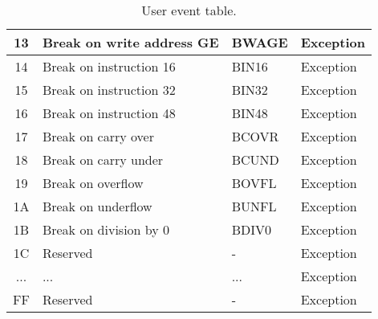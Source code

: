 \begin{table}[hbt!]
\begin{center}
\begin{tabular}{|c|l|l|l|}
        \hline
        13 & Break on write address GE & BWAGE & Exception \\
        \hline
        14 & Break on instruction 16 & BIN16 & Exception \\
        \hline
        15 & Break on instruction 32 & BIN32 & Exception \\
        \hline
        16 & Break on instruction 48 & BIN48 & Exception \\
        \hline
        17 & Break on carry over & BCOVR & Exception \\
        \hline
        18 & Break on carry under & BCUND & Exception \\
        \hline
        19 & Break on overflow & BOVFL & Exception \\
        \hline
        1A & Break on underflow & BUNFL & Exception \\
        \hline
        1B & Break on division by 0 & BDIV0 & Exception \\
        \hline
        1C & Reserved & - & Exception \\
        \hline
        ... & ... & ... & Exception \\
        \hline
        FF & Reserved & - & Exception \\
        \hline

    \end{tabular}

    \caption[User event table]{User event table.}

    \end{center}

\end{table}